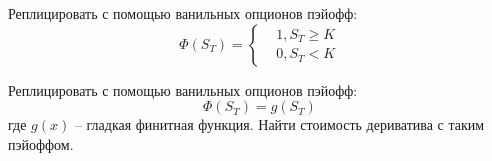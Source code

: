 \documentclass[12pt]{article}
\begin{document}
\begin{problem}
    Реплицировать с помощью ванильных опционов пэйофф:
    $$
        \Phi(S_T) = \begin{cases} 
            &1, S_T \geq K \\
            &0, S_T < K
         \end{cases}
    $$
\end{problem}

\begin{problem}
    Реплицировать с помощью ванильных опционов пэйофф:
    $$
        \Phi(S_T) = g(S_T)
    $$где $g(x)$ -- гладкая финитная функция. Найти стоимость дериватива с таким пэйоффом.
\end{problem}
\end{document}
